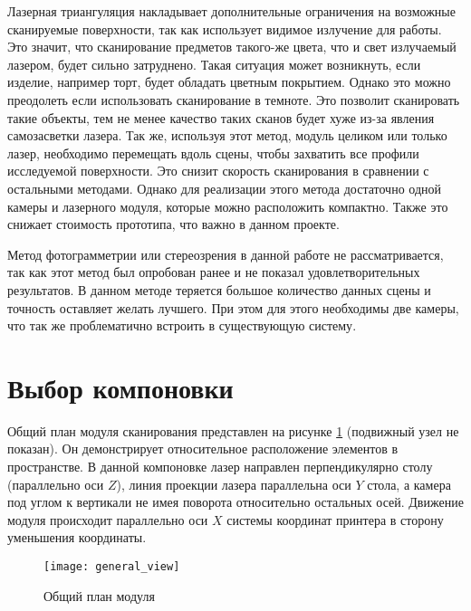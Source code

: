         Лазерная триангуляция накладывает дополнительные ограничения на возможные сканируемые поверхности, так как использует видимое излучение для работы. Это значит, что сканирование предметов такого-же цвета, что и свет излучаемый лазером, будет сильно затруднено. Такая ситуация может возникнуть, если изделие, например торт, будет обладать цветным покрытием. Однако это можно преодолеть если использовать сканирование в темноте. Это позволит сканировать такие объекты, тем не менее качество таких сканов будет хуже из-за явления самозасветки лазера.
        Так же, используя этот метод, модуль целиком или только лазер, необходимо перемещать вдоль сцены, чтобы захватить все профили исследуемой поверхности. Это снизит скорость сканирования в сравнении с остальными методами.
        Однако для реализации этого метода достаточно одной камеры и лазерного модуля, которые можно расположить компактно. Также это снижает стоимость прототипа, что важно в данном проекте.

        Метод фотограмметрии или стереозрения в данной работе не рассматривается, так как этот метод был опробован ранее и не показал удовлетворительных результатов. В данном методе теряется большое количество данных сцены и точность оставляет желать лучшего. При этом для этого необходимы две камеры, что так же проблематично встроить в существующую систему\cite{SkripkoPASEKA}.
        
    \section{Выбор компоновки}
        Общий план модуля сканирования представлен на рисунке \ref{pic:general_view} (подвижный узел не показан). Он демонстрирует относительное расположение элементов в пространстве. В данной компоновке лазер направлен перпендикулярно столу (параллельно оси $ Z $), линия проекции лазера параллельна оси $ Y $ стола, а камера под углом к вертикали не имея поворота относительно остальных осей. Движение модуля происходит параллельно оси $ X $ системы координат принтера в сторону уменьшения координаты.

        \begin{figure}[H]
            \centering
            \texttt{[image: general\_view]}
            \caption{Общий план модуля}
            \label{pic:general_view}
        \end{figure}


